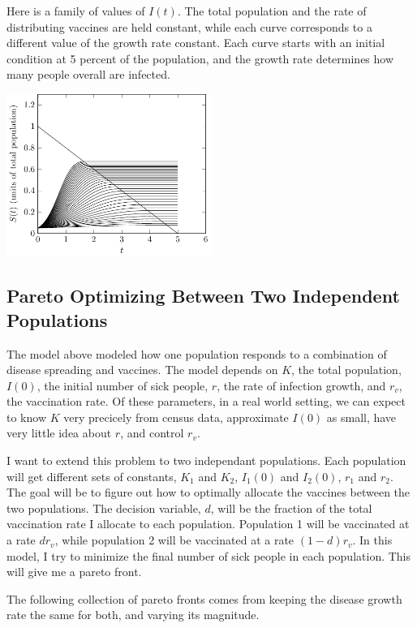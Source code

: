 \documentclass{article}
\begin{document}
Here is a family of values of $I(t)$.
The total population and the rate of distributing vaccines are
	held constant, while each curve corresponds to a different
	value of the growth rate constant.
Each curve starts with an initial condition at 5 percent of the
	population, and the growth rate determines how many people
	overall are infected.

\includegraphics[width=0.5\textwidth]{figures/vaccination-model-curves-varying-s.pdf}


\subsection{Pareto Optimizing Between Two Independent Populations}

The model above modeled how one population responds to a combination
	of disease spreading and vaccines.
The model depends on $K$, the total population, $I(0)$, the initial
	number of sick people, $r$, the rate of infection growth,
	and $r_v$, the vaccination rate.
Of these parameters, in a real world setting, we can expect to know $K$
	very precicely from census data, approximate $I(0)$ as small,
	have very little idea about $r$, and control $r_v$.

I want to extend this problem to two independant populations.
Each population will get different sets of constants,
	$K_1$ and $K_2$, $I_1(0)$ and $I_2(0)$, $r_1$ and $r_2$.
The goal will be to figure out how to optimally allocate the
	vaccines between the two populations.
The decision variable, $d$, will be the fraction of the total vaccination
	rate I allocate to each population.
Population 1 will be vaccinated at a rate $d r_v$, while population
	2 will be vaccinated at a rate $(1 - d) r_v$.
In this model, I try to minimize the final number of sick people in
	each population.
This will give me a pareto front.

The following collection of pareto fronts comes from keeping the disease
	growth rate the same for both, and varying its magnitude.
\end{document}
